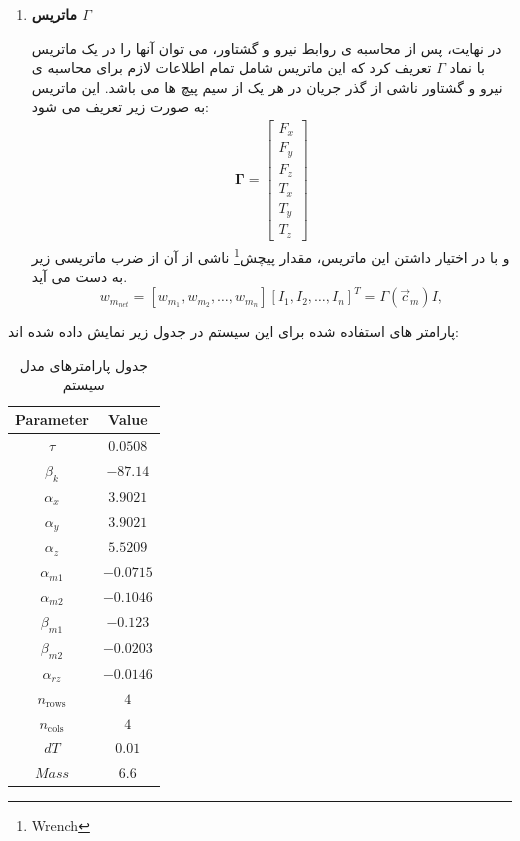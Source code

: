 \begin{enumerate}
	\item \textbf{ماتریس $\Gamma$}
	
	در نهایت، پس از محاسبه ی روابط نیرو و گشتاور، می توان آنها را در یک ماتریس با نماد $\Gamma$ تعریف کرد که این ماتریس شامل تمام اطلاعات لازم برای محاسبه ی نیرو و گشتاور ناشی از گذر جریان در هر یک از سیم پیچ ها می باشد. این ماتریس به صورت زیر تعریف می شود:
	\begin{align}
		\mathbf{\Gamma} =
		\begin{bmatrix}
			F_x \\ F_y \\ F_z \\ T_x \\ T_y \\ T_z
		\end{bmatrix}
		\label{eq:method-Gamma-def}
	\end{align}
	و با در اختیار داشتن این ماتریس، مقدار پیچش\footnote{Wrench} ناشی از آن از ضرب ماتریسی زیر به دست می آید.
	\begin{equation}
		w_{m_{net}} = [w_{m_1}, w_{m_2}, \dots, w_{m_n}] [I_1, I_2, \dots, I_n]^T = \Gamma(\vec{c}_m) I,
		\label{eq:method-wrench-net}
	\end{equation}
	
	
\end{enumerate}
	
	پارامتر های استفاده شده برای این سیستم در جدول زیر نمایش داده شده اند:
	\begin{table}[htbp]
		\centering
		\begin{tabular}{|c|c|}
			\hline
			\textbf{Parameter} & \textbf{Value} \\
			\hline
			$\tau$ & $0.0508$ \\
			$\beta_k$ & $-87.14$ \\
			$\alpha_x$ & $3.9021$ \\
			$\alpha_y$ & $3.9021$ \\
			$\alpha_z$ & $5.5209$ \\
			$\alpha_{m1}$ & $-0.0715$ \\
			$\alpha_{m2}$ & $-0.1046$ \\
			$\beta_{m1}$ & $-0.123$ \\
			$\beta_{m2}$ & $-0.0203$ \\
			$\alpha_{rz}$ & $-0.0146$ \\
			$n_{\text{rows}}$ & $4$ \\
			$n_{\text{cols}}$ & $4$ \\
			$dT$ & $0.01$ \\
			$Mass$ & $6.6$ \\
			\hline
		\end{tabular}
		\caption{جدول پارامترهای مدل سیستم}
		\label{tab:method-parameters}
	\end{table}
	
